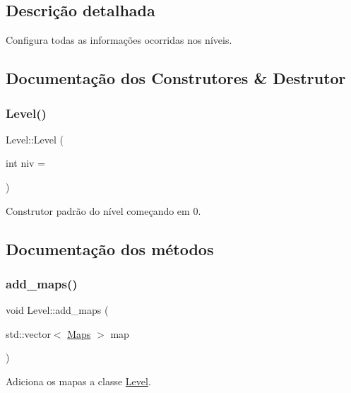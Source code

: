 \subsection{Descrição detalhada}
Configura todas as informações ocorridas nos níveis. 

\subsection{Documentação dos Construtores \& Destrutor}
\mbox{\label{classLevel_a77d956a65bbff2de6e105e16f2792353}} 
\subsubsection{\texorpdfstring{Level()}{Level()}}
{\footnotesize\ttfamily Level\+::\+Level (\begin{DoxyParamCaption}\item[{int}]{niv = {} }\end{DoxyParamCaption})\hspace{0.3cm}{\ttfamily [inline]}}



Construtor padrão do nível começando em 0. 



\subsection{Documentação dos métodos}
\mbox{\label{classLevel_a0e39d944b4e0a37f25ad5de0a5e37492}} 
\subsubsection{\texorpdfstring{add\+\_\+maps()}{add\_maps()}}
{\footnotesize\ttfamily void Level\+::add\+\_\+maps (\begin{DoxyParamCaption}\item[{std\+::vector$<$ \hyperlink{classMaps}{Maps} $>$}]{map }\end{DoxyParamCaption})\hspace{0.3cm}{\ttfamily [inline]}}



Adiciona os mapas a classe \hyperlink{classLevel}{Level}. 

